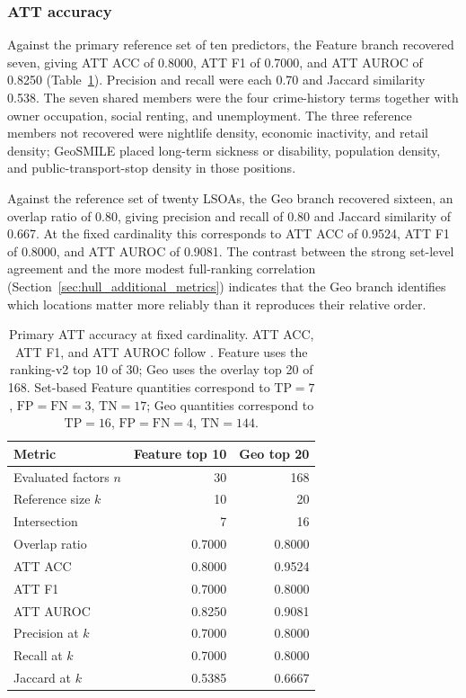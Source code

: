 \subsubsection{ATT accuracy}
\label{sec:hull_att_accuracy}

Against the primary reference set of ten predictors, the Feature branch recovered seven, giving ATT ACC of 0.8000, ATT F1 of 0.7000, and ATT AUROC of 0.8250 (Table~\ref{tab:hull_att_accuracy_primary}). Precision and recall were each 0.70 and Jaccard similarity 0.538. The seven shared members were the four crime-history terms together with owner occupation, social renting, and unemployment. The three reference members not recovered were nightlife density, economic inactivity, and retail density; GeoSMILE placed long-term sickness or disability, population density, and public-transport-stop density in those positions.

Against the reference set of twenty LSOAs, the Geo branch recovered sixteen, an overlap ratio of 0.80, giving precision and recall of 0.80 and Jaccard similarity of 0.667. At the fixed cardinality this corresponds to ATT ACC of 0.9524, ATT F1 of 0.8000, and ATT AUROC of 0.9081. The contrast between the strong set-level agreement and the more modest full-ranking correlation (Section~\ref{sec:hull_additional_metrics}) indicates that the Geo branch identifies which locations matter more reliably than it reproduces their relative order.

\begin{table}[H]
\centering
\caption{Primary ATT accuracy at fixed cardinality.
ATT ACC, ATT F1, and ATT AUROC follow \citet{dehghani_smile_thesis}.
Feature uses the ranking-v2 top 10 of 30; Geo uses the overlay top 20 of 168.
Set-based Feature quantities correspond to $\mathrm{TP}=7$, $\mathrm{FP}=\mathrm{FN}=3$, $\mathrm{TN}=17$;
Geo quantities correspond to $\mathrm{TP}=16$, $\mathrm{FP}=\mathrm{FN}=4$, $\mathrm{TN}=144$.}
\label{tab:hull_att_accuracy_primary}
\small
\begin{tabular}{lrr}
\toprule
Metric & Feature top 10 & Geo top 20 \\
\midrule
Evaluated factors $n$ & 30 & 168 \\
Reference size $k$ & 10 & 20 \\
Intersection & 7 & 16 \\
Overlap ratio & 0.7000 & 0.8000 \\
ATT ACC & 0.8000 & 0.9524 \\
ATT F1 & 0.7000 & 0.8000 \\
ATT AUROC & 0.8250 & 0.9081 \\
Precision at $k$ & 0.7000 & 0.8000 \\
Recall at $k$ & 0.7000 & 0.8000 \\
Jaccard at $k$ & 0.5385 & 0.6667 \\
\bottomrule
\end{tabular}
\end{table}

